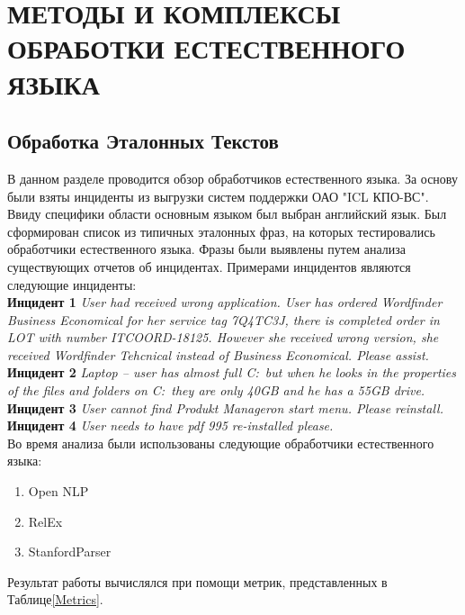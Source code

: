 \chapter{МЕТОДЫ И КОМПЛЕКСЫ ОБРАБОТКИ ЕСТЕСТВЕННОГО ЯЗЫКА} \label{chapt2}

\section{Обработка Эталонных Текстов} \label{sect2_1}
В данном разделе проводится обзор обработчиков естественного языка. За основу были взяты инциденты из выгрузки систем поддержки ОАО "ICL КПО-ВС". \\
Ввиду специфики области основным языком был выбран английский язык. Был сформирован список из типичных эталонных фраз, на которых тестировались обработчики естественного языка. Фразы были выявлены путем анализа существующих отчетов об инцидентах. Примерами инцидентов являются следующие инциденты:\\
\textbf{Инцидент 1}
\textit{
User had received wrong application. User has ordered Wordfinder Business Economical for her service tag 7Q4TC3J, there is completed order in LOT with number ITCOORD-18125. However she received wrong version, she received Wordfinder Tehcnical instead of Business Economical. Please assist.
}\\
\textbf{Инцидент 2}
\textit{
Laptop – user has almost full C:\ but when he looks in the properties of the files and folders on C:\ they are only 40GB and he has a 55GB drive.
}\\
\textbf{Инцидент 3}
\textit{
User cannot find Produkt Manageron start menu. Please reinstall. 
}\\
\textbf{Инцидент 4}
\textit{
User needs to have pdf 995 re-installed please.
}\\

Во время анализа были использованы следующие обработчики естественного языка:
\begin {enumerate}
	\item{Open NLP}\cite{OpenNLP}
	\item{RelEx}\cite{OpenCogRelex}
	\item{StanfordParser}\cite{StanfordParser}
\end {enumerate}

Результат работы вычислялся при помощи метрик, представленных в Таблице\ref{Metrics}. 

